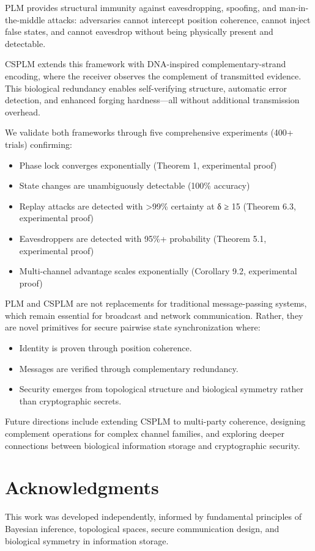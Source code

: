 \documentclass[11pt,a4paper]{article}
\theoremstyle{definition}
\begin{document}
PLM provides structural immunity against eavesdropping, spoofing, and man-in-the-middle attacks: adversaries cannot intercept position coherence, cannot inject false states, and cannot eavesdrop without being physically present and detectable.

CSPLM extends this framework with DNA-inspired complementary-strand encoding, where the receiver observes the complement of transmitted evidence. This biological redundancy enables self-verifying structure, automatic error detection, and enhanced forging hardness—all without additional transmission overhead.

We validate both frameworks through five comprehensive experiments (400+ trials) confirming:
\begin{itemize}
\item Phase lock converges exponentially (Theorem 1, experimental proof)
\item State changes are unambiguously detectable (100\% accuracy)
\item Replay attacks are detected with >99\% certainty at δ ≥ 15 (Theorem 6.3, experimental proof)
\item Eavesdroppers are detected with 95\%+ probability (Theorem 5.1, experimental proof)
\item Multi-channel advantage scales exponentially (Corollary 9.2, experimental proof)
\end{itemize}

PLM and CSPLM are not replacements for traditional message-passing systems, which remain essential for broadcast and network communication. Rather, they are novel primitives for secure pairwise state synchronization where:
\begin{itemize}
\item Identity is proven through position coherence.
\item Messages are verified through complementary redundancy.
\item Security emerges from topological structure and biological symmetry rather than cryptographic secrets.
\end{itemize}

Future directions include extending CSPLM to multi-party coherence, designing complement operations for complex channel families, and exploring deeper connections between biological information storage and cryptographic security.

\section*{Acknowledgments}

This work was developed independently, informed by fundamental principles of Bayesian inference, topological spaces, secure communication design, and biological symmetry in information storage.



\end{document}
